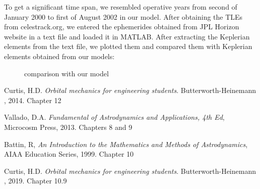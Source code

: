 \documentclass[11pt,a4paper]{report}
\begin{document}
To get a significant time span, we resembled operative years from second of January 2000 to first of August 2002 in our model. After obtaining the TLEs from celestrack.org, we entered the ephemerides obtained from JPL Horizon website in a text file and loaded it in MATLAB. After extracting the Keplerian elements from the text file, we plotted them  and compared them with Keplerian elements obtained from our models: 

\begin{figure}[H]
\centering
\caption{comparison with our model}
\end{figure}

\begin{thebibliography}{9}
Curtis, H.D. 
\textit{Orbital mechanics for engineering students}. 
Butterworth-Heinemann , 2014. Chapter 12

Vallado, D.A.
\textit{Fundamental of Astrodynamics and Applications, 4th
Ed}, Microcosm Press, 2013. Chapters 8 and 9

Battin, R,
\textit{An Introduction to the Mathematics and Methods of
Astrodynamics}, AIAA Education Series, 1999. Chapter 10

Curtis, H.D. 
\textit{Orbital mechanics for engineering students}. 
Butterworth-Heinemann , 2019. Chapter 10.9

\end{thebibliography}
\end{document}
